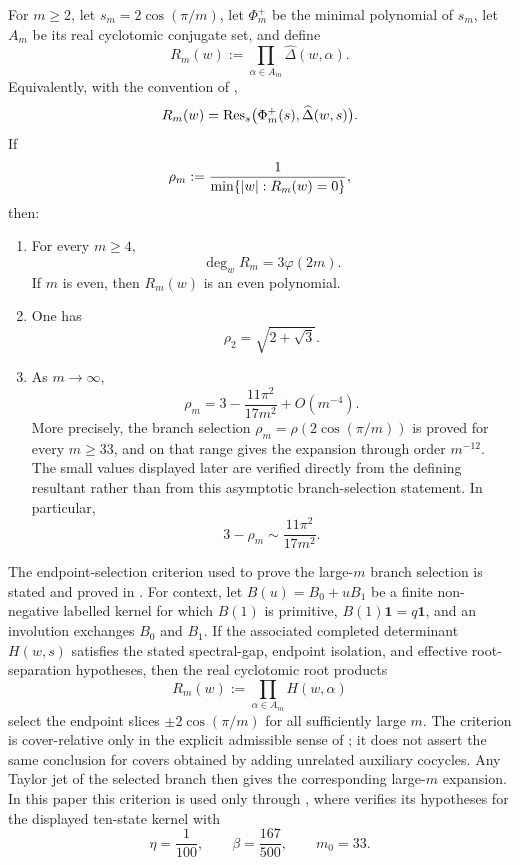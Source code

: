 \begin{theorem}
\label{thm:intro-kernel-cyclotomic}
For \(m\ge 2\), let \(s_m=2\cos(\pi/m)\), let \(\Phi_m^+\) be the
minimal polynomial of \(s_m\), let \(A_m\) be its real cyclotomic
conjugate set, and define
\[
  R_m(w):=\prod_{\alpha\in A_m}\widehat\Delta(w,\alpha).
\]
Equivalently, with the convention of
,
\[
  R_m(w)=\operatorname{Res}_s\bigl(\Phi_m^+(s),\widehat\Delta(w,s)\bigr).
\]
If
\[
  \rho_m:=\frac{1}{\min\{\lvert w \rvert:R_m(w)=0\}},
\]
then:
\begin{enumerate}[label=\textup{(\roman*)}]
  \item For every \(m\ge 4\),
  \[
    \deg_w R_m=3\varphi(2m).
  \]
  If \(m\) is even, then \(R_m(w)\) is an even polynomial.

  \item One has
  \[
    \rho_2=\sqrt{2+\sqrt3}.
  \]

  \item As \(m\to\infty\),
  \[
    \rho_m
    =3-\frac{11\pi^2}{17m^2}+O(m^{-4}).
  \]
  More precisely, the branch selection
  \(\rho_m=\rho(2\cos(\pi/m))\) is proved for every \(m\ge33\), and on
  that range  gives the expansion through order
  \(m^{-12}\). The small values displayed later are
  verified directly from the defining resultant rather than from this
  asymptotic branch-selection statement. In particular,
  \[
    3-\rho_m\sim \frac{11\pi^2}{17m^2}.
  \]
\end{enumerate}
\end{theorem}

The endpoint-selection criterion used to prove the large-\(m\) branch
selection is stated and proved in .
For context, let \(B(u)=B_0+uB_1\) be a finite non-negative labelled
kernel for which \(B(1)\) is primitive, \(B(1)\mathbf1=q\mathbf1\), and
an involution exchanges \(B_0\) and \(B_1\).  If the associated completed
determinant \(H(w,s)\) satisfies the stated spectral-gap, endpoint
isolation, and effective root-separation hypotheses, then the real
cyclotomic root products
\[
  R_m(w):=\prod_{\alpha\in A_m}H(w,\alpha)
\]
select the endpoint slices \(\pm2\cos(\pi/m)\) for all sufficiently large
\(m\).  The criterion is cover-relative only in the explicit admissible
sense of ; it does not assert the
same conclusion for covers obtained by adding unrelated auxiliary
cocycles.  Any Taylor jet of the selected branch then gives the
corresponding large-\(m\) expansion.  In this paper this criterion is
used only through , where
 verifies its hypotheses for the displayed
ten-state kernel with
\[
  \eta=\frac1{100},\qquad \beta=\frac{167}{500},\qquad m_0=33.
\]

